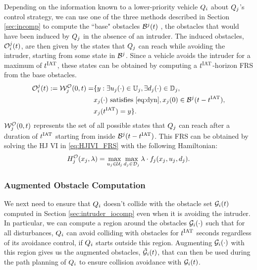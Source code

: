 Depending on the information known to a lower-priority vehicle $Q_i$ about $Q_j$'s control strategy, we can use one of the three methods described in Section \ref{sec:incomp} to compute the ``base" obstacles $\mathcal{B}^j(t)$ , the obstacles that would have been induced by $Q_j$ in the absence of an intruder. The induced obstacles, $\mathcal{O}_i^j(t)$, are then given by the states that $Q_j$ can reach while avoiding the intruder, starting from some state in $\mathcal{B}^j$. Since a vehicle avoids the intruder for a maximum of $t^\text{IAT}$, these states can be obtained by computing a $t^\text{IAT}$-horizon FRS from the base obstacles.
\begin{equation} \label{eq:intObs}
\begin{aligned}
\ioset_i^j(t) := \frs_{j}^{\mathcal{O}}(0, t) = & \{y: \exists \ctrl_j(\cdot) \in \cfset_j, \exists \dstb_j(\cdot) \in \dfset_j, \\
& \state_j(\cdot) \text{ satisfies \eqref{eq:dyn}}, \state_j(0) \in \boset^j(t-\iat), \\
& \state_j(\iat) = y\}.
\end{aligned}
\end{equation}
$\mathcal{W}_{j}^{\mathcal{O}}(0, t)$ represents the set of all possible states that $Q_j$ can reach after a duration of $t^\text{IAT}$ starting from inside $\mathcal{B}^j(t-t^\text{IAT})$. This FRS can be obtained by solving the HJ VI in \eqref{eq:HJIVI_FRS} with the following Hamiltonian:
\begin{equation}
\ham_{j}^{\mathcal{O}}(\state_j, \costate) = \max_{\ctrl_j \in \cset_j} \max_{\dstb_j \in \dset_j} \costate \cdot f_j (\state_j, \ctrl_j, \dstb_j) \label{intobs2}.
\end{equation} 
%
%

\subsubsection{Augmented Obstacle Computation} \label{sec:intruder_aocomp}
We next need to ensure that $Q_i$ doesn't collide with the obstacle set $\mathcal{G}_i(t)$ computed in Section \ref{sec:intruder_iocomp} even when it is avoiding the intruder. In particular, we can compute a region around the obstacles $\mathcal{G}_i(\cdot)$ such that for all disturbances, $Q_i$ can avoid colliding with obstacles for $t^\text{IAT}$ seconds regardless of its avoidance control, if $Q_i$ starts outside this region. Augmenting $\mathcal{G}_i(\cdot)$ with this region gives us the augmented obstacles, $\tilde{\mathcal{G}}_i(t)$, that can then be used during the path planning of $Q_i$ to ensure collision avoidance with $\mathcal{G}_i(t)$.  

